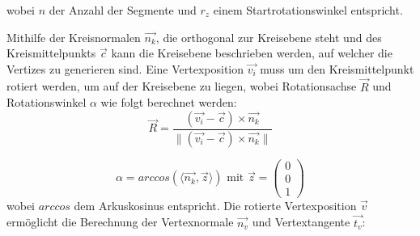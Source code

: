 wobei $n$ der Anzahl der Segmente und $r_z$ einem Startrotationswinkel entspricht.

Mithilfe der Kreisnormalen $\overrightarrow{n_k}$, die orthogonal zur Kreisebene steht und des Kreismittelpunkts $\overrightarrow{c}$ kann die Kreisebene beschrieben werden, auf welcher die Vertizes zu generieren sind. Eine Vertexposition $\overrightarrow{v_i}$ muss um den Kreismittelpunkt rotiert werden, um auf der Kreisebene zu liegen, wobei Rotationsachse $\overrightarrow{R}$ und Rotationswinkel $\alpha$ wie folgt berechnet werden:
\begin{equation}
\overrightarrow{R} = \dfrac{(\overrightarrow{v_i} - \overrightarrow{c}) \times \overrightarrow{n_k}}{\lVert (\overrightarrow{v_i} - \overrightarrow{c}) \times \overrightarrow{n_k} \rVert}
\end{equation}

\begin{equation}
\alpha = arccos(\langle \overrightarrow{n_k}, \overrightarrow{z} \rangle) \text{ mit } \overrightarrow{z} = \begin{pmatrix}
0\\
0\\
1
\end{pmatrix}
\end{equation}
 wobei $arccos$ dem Arkuskosinus entspricht. \cite{RotationBetweenVectors:16} 
 Die rotierte Vertexposition $\overrightarrow{v}$ ermöglicht die Berechnung der Vertexnormale $\overrightarrow{n_v}$ und Vertextangente $\overrightarrow{t_v}$:
 

